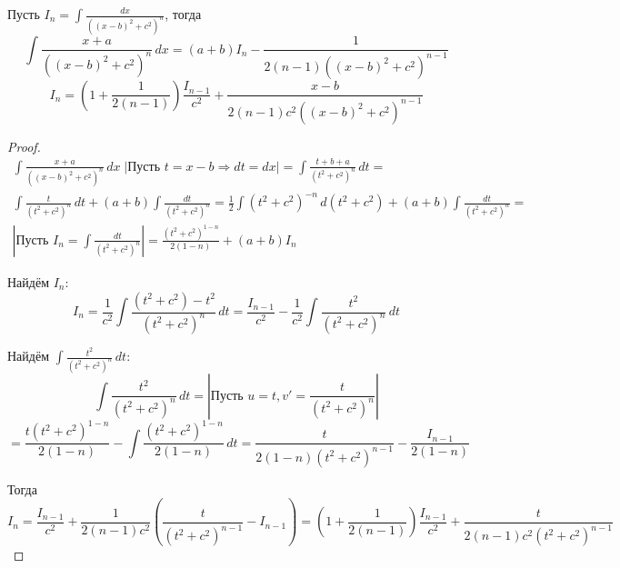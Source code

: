\begin{itemize}
	Пусть $\displaystyle I_n = \int \frac{dx}{((x - b)^2 + c^2)^n}$, тогда
	\begin{equation*}
	\int \frac{x + a}{((x - b)^2 + c^2)^n}\,dx =
	(a + b)I_n - \frac1{2(n - 1)((x - b)^2 + c^2)^{n-1}}
	\end{equation*}
	\begin{equation*}
	I_n = \left( 1 + \frac1{2(n - 1)} \right) \frac{I_{n-1}}{c^2} + \frac{x - b}{2(n - 1)c^2 ((x - b)^2 + c^2)^{n-1}}
	\end{equation*}
	\begin{proof}
	\begin{equation}
	\label{eq:int_of_simple_frac_proof1}
	\begin{gathered}
	\int \frac{x + a}{((x - b)^2 + c^2)^n}\,dx \;
	\left| \text{Пусть } t = x - b \Rightarrow dt = dx \right| =
	\int \frac{t + b + a}{(t^2 + c^2)^n}\,dt = \\
	\int \frac{t}{(t^2 + c^2)^n}\,dt + (a + b) \int \frac{dt}{(t^2 + c^2)^n} =
	\frac12 \int (t^2 + c^2)^{-n}\,d(t^2 + c^2) + (a + b) \int \frac{dt}{(t^2 + c^2)^n} = \\
	\left| \text{Пусть } I_n = \int \frac{dt}{(t^2 + c^2)^n} \right| =
	\frac{(t^2 + c^2)^{1-n}}{2(1 - n)} + (a + b)I_n
	\end{gathered}
	\end{equation}
	
	Найдём $I_n$:
	\begin{equation*}
	I_n = \frac1{c^2} \int \frac{(t^2 + c^2) - t^2}{(t^2 + c^2)^n}\,dt =
	\frac{I_{n-1}}{c^2} - \frac1{c^2} \int \frac{t^2}{(t^2 + c^2)^n}\,dt
	\end{equation*}
	
	Найдём $\displaystyle \int \frac{t^2}{(t^2 + c^2)^n}\,dt$:
	\begin{equation*}
	\int \frac{t^2}{(t^2 + c^2)^n}\,dt =
	\left| \text{Пусть } u = t, v' = \frac{t}{(t^2 + c^2)^n} \right|
	\end{equation*}
	\begin{equation*}
	= \frac{t(t^2 + c^2)^{1-n}}{2(1 - n)} - \int \frac{(t^2 + c^2)^{1-n}}{2(1 - n)}\,dt =
	\frac{t}{2(1 - n)(t^2 + c^2)^{n-1}} - \frac{I_{n-1}}{2(1 - n)}
	\end{equation*}
	
	Тогда
	\begin{equation*}
	I_n = \frac{I_{n-1}}{c^2} + \frac1{2(n - 1)c^2} \left( \frac{t}{(t^2 + c^2)^{n-1}} - I_{n-1} \right) =
	\left( 1 + \frac1{2(n - 1)} \right) \frac{I_{n-1}}{c^2} + \frac{t}{2(n - 1)c^2 (t^2 + c^2)^{n-1}}
	\end{equation*}
	

\end{proof}
\end{itemize}
